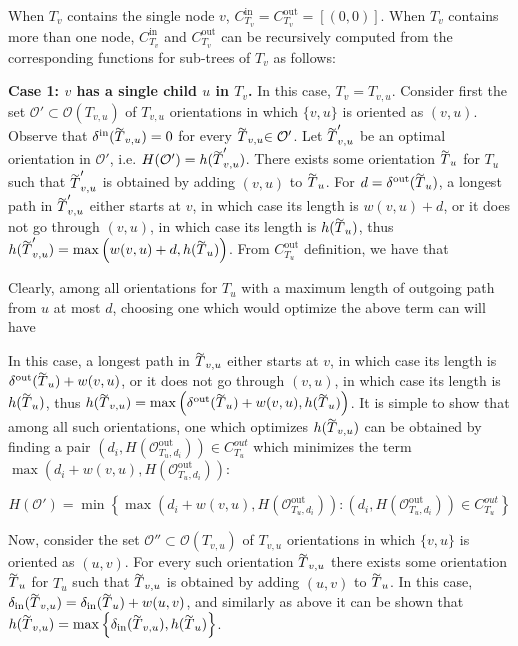 When $T_v$ contains the single node $v$, $C^\text{in}_{T_v} = C^\text{out}_{T_v} = \left[(0, 0)\right]$. When $T_v$ contains more than one node, $C^\text{in}_{T_v}$ and $C^\text{out}_{T_v}$  can be recursively computed from the corresponding functions for sub-trees of $T_v$ as follows:

\textbf{Case 1: $v$ has a single child $u$ in $T_v$.}
In this case, $T_v = T_{v,u}$. 
Consider first the set $\mathcal{O}' \subset \mathcal{O}(T_{v, u})$ of $T_{v, u}$ orientations in which $\{v, u\}$ is oriented as $(v, u)$. Observe that $\delta^\text{in}(\tildeb{T}_{v,u}) = 0$ for every $\tildeb{T}_{v,u} \in \mathcal{O}'$. Let $\tildeb{T}'_{v,u}$ be an optimal orientation in $\mathcal{O}'$, i.e. $H(\mathcal{O}') = h(\tildeb{T}'_{v,u})$. There exists some orientation $\tildeb{T}_u$ for $T_u$ such that $\tildeb{T}'_{v,u}$ is obtained by adding $(v, u)$ to $\tildeb{T}_u$. For $d = \delta^\text{out}(\tildeb{T}_u)$, a longest path in $\tildeb{T}'_{v,u}$ either starts at $v$, in which case its length is $w(v,u) + d$, or it does not go through $(v,u)$, in which case its length is $h(\tildeb{T}_u)$, thus $h(\tildeb{T}'_{v,u}) = \max\left(w(v,u) + d, h(\tildeb{T}_u)\right)$. From $C^\text{out}_{T_u}$ definition, we have that 

Clearly, among all orientations for $T_u$ with a maximum length of outgoing path from $u$ at most $d$, choosing one which would optimize the above term can will have


In this case, a longest path in $\tildeb{T}_{v,u}$ either starts at $v$, in which case its length is $\delta^\text{out}(\tildeb{T}_u) + w(v,u)$, or it does not go through $(v,u)$, in which case its length is $h(\tildeb{T}_u)$, thus $h(\tildeb{T}_{v,u}) = \max\left(\delta^\text{out}(\tildeb{T}_u) + w(v,u), h(\tildeb{T}_u)\right)$. It is simple to show that among all such orientations, one which optimizes $h(\tildeb{T}_{v,u})$ can be obtained by finding a pair $(d_i, H(\mathcal{O}^\text{out}_{T_u, d_i})) \in C^{out}_{T_u}$ which minimizes the term $\max\left(d_i + w(v,u), H(\mathcal{O}^\text{out}_{T_u, d_i})\right)$:

$$
H(\mathcal{O}') = \min\left\{\max\left(d_i + w(v,u), H(\mathcal{O}^\text{out}_{T_u, d_i})\right) : (d_i, H(\mathcal{O}^\text{out}_{T_u, d_i})) \in C^{out}_{T_u}\right\}
$$


Now, consider the set $\mathcal{O}'' \subset \mathcal{O}(T_{v, u})$ of $T_{v, u}$ orientations in which $\{v, u\}$ is oriented as $(u, v)$. For every such orientation $\tildeb{T}_{v,u}$ there exists some orientation $\tildeb{T}_u$ for $T_u$ such that $\tildeb{T}_{v,u}$ is obtained by adding $(u, v)$ to $\tildeb{T}_u$. In this case, $\delta_{\text{in}}(\tildeb{T}_{v,u}) = \delta_{\text{in}}(\tildeb{T}_{u}) + w(u,v)$, and similarly as above it can be shown that $h(\tildeb{T}_{v,u}) = \max\left\{\delta_{\text{in}}(\tildeb{T}_{v,u}), h(\tildeb{T}_{u})\right\}$. 

